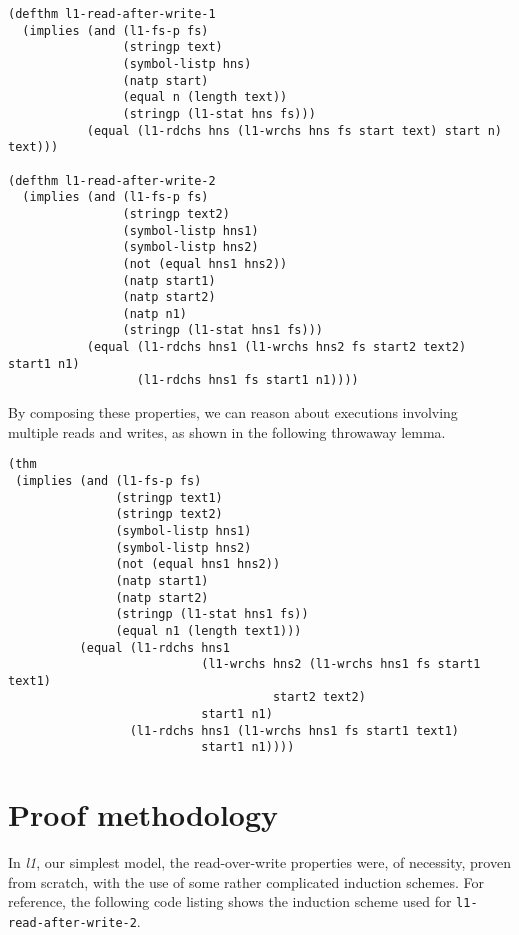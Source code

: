 \documentclass[runningheads,a4paper]{llncs}
\begin{document}
\noindent
\begin{verbatim}
(defthm l1-read-after-write-1
  (implies (and (l1-fs-p fs)
                (stringp text)
                (symbol-listp hns)
                (natp start)
                (equal n (length text))
                (stringp (l1-stat hns fs)))
           (equal (l1-rdchs hns (l1-wrchs hns fs start text) start n) text)))

(defthm l1-read-after-write-2
  (implies (and (l1-fs-p fs)
                (stringp text2)
                (symbol-listp hns1)
                (symbol-listp hns2)
                (not (equal hns1 hns2))
                (natp start1)
                (natp start2)
                (natp n1)
                (stringp (l1-stat hns1 fs)))
           (equal (l1-rdchs hns1 (l1-wrchs hns2 fs start2 text2) start1 n1)
                  (l1-rdchs hns1 fs start1 n1))))
\end{verbatim}

By composing these properties, we can reason about executions
involving multiple reads and writes, as shown in the following
throwaway lemma.

\medskip

\noindent
\begin{verbatim}
(thm
 (implies (and (l1-fs-p fs)
               (stringp text1)
               (stringp text2)
               (symbol-listp hns1)
               (symbol-listp hns2)
               (not (equal hns1 hns2))
               (natp start1)
               (natp start2)
               (stringp (l1-stat hns1 fs))
               (equal n1 (length text1)))
          (equal (l1-rdchs hns1
                           (l1-wrchs hns2 (l1-wrchs hns1 fs start1 text1)
                                     start2 text2)
                           start1 n1)
                 (l1-rdchs hns1 (l1-wrchs hns1 fs start1 text1)
                           start1 n1))))
\end{verbatim}

\section{Proof methodology}

In \textit{l1}, our simplest model, the read-over-write properties
were, of necessity, proven from scratch, with the use of some rather
complicated induction schemes. For reference, the following code listing shows
the induction scheme used for \texttt{l1-read-after-write-2}.

\medskip
\end{document}
